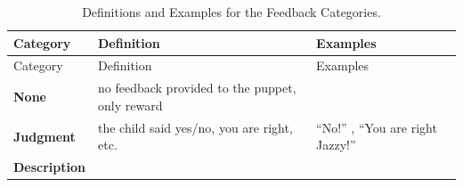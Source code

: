 \documentclass[floatsintext,man]{apa6}
\theoremstyle{definition}
\theoremstyle{definition}
\theoremstyle{definition}
\theoremstyle{remark}
\begin{document}
\begin{longtable}[]{@{}lll@{}}
\caption{\label{tab:feedbackCat} Definitions and Examples for the Feedback
Categories.}\tabularnewline
\toprule
\begin{minipage}[b]{0.11\columnwidth}\raggedright\strut
Category\strut
\end{minipage} & \begin{minipage}[b]{0.46\columnwidth}\raggedright\strut
Definition\strut
\end{minipage} & \begin{minipage}[b]{0.32\columnwidth}\raggedright\strut
Examples\strut
\end{minipage}\tabularnewline
\midrule
\endfirsthead
\toprule
\begin{minipage}[b]{0.11\columnwidth}\raggedright\strut
Category\strut
\end{minipage} & \begin{minipage}[b]{0.46\columnwidth}\raggedright\strut
Definition\strut
\end{minipage} & \begin{minipage}[b]{0.32\columnwidth}\raggedright\strut
Examples\strut
\end{minipage}\tabularnewline
\midrule
\endhead
\begin{minipage}[t]{0.11\columnwidth}\raggedright\strut
\textbf{None}\strut
\end{minipage} & \begin{minipage}[t]{0.46\columnwidth}\raggedright\strut
no feedback provided to the puppet, only reward\strut
\end{minipage} & \begin{minipage}[t]{0.32\columnwidth}\raggedright\strut
\strut
\end{minipage}\tabularnewline
\begin{minipage}[t]{0.11\columnwidth}\raggedright\strut
\textbf{Judgment}\strut
\end{minipage} & \begin{minipage}[t]{0.46\columnwidth}\raggedright\strut
the child said yes/no, you are right, etc.\strut
\end{minipage} & \begin{minipage}[t]{0.32\columnwidth}\raggedright\strut
\enquote{No!} , \enquote{You are right Jazzy!}\strut
\end{minipage}\tabularnewline
\begin{minipage}[t]{0.11\columnwidth}\raggedright\strut
\textbf{Description}\strut
\end{minipage} & \begin{minipage}[t]{0.46\columnwidth}\raggedright\strut

\end{minipage}
\end{longtable}
\end{document}
